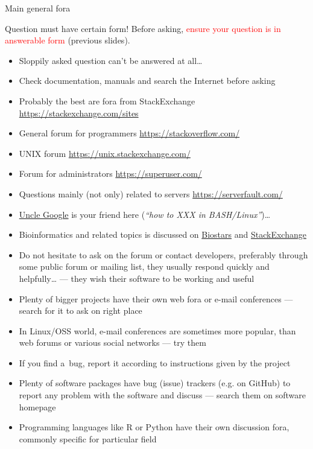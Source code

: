 \documentclass[compress, ucs, xelatex, 11pt, xcolor=svgnames, aspectratio=169,
	hyperref={
		bookmarks=true,
		unicode=true,
		colorlinks=true,
		pdftitle={Linux, command line and MetaCentrum},
		plainpages=false,
		pdfauthor={Vojtech Zeisek},
		pdfsubject={Course about use of Linux command line, writing shell scripts and using MetaCentrum of CESNET},
		pdfcreator={XeLaTeX},
		pdfkeywords={Linux, GNU, BASH, shell, command line, MetaCentrum},
		linkcolor=DarkRed, %
		anchorcolor=DarkBlue, %
		citecolor=Indigo, %
		filecolor=NavyBlue, %
		menucolor=DarkMagenta, %
		urlcolor=DarkBlue, %
		pdftex},
	url={hyphens, lowtilde} %
	]{beamer}
\renewcommand{\alert}[1]{\textcolor{red}{#1}}
\begin{document}
\begin{frame}[allowframebreaks]{Main general fora}
	\begin{block}{Question must have certain form!}
			Before asking, \alert{ensure your question is in answerable form} (previous slides).
		\begin{itemize}
			\item Sloppily asked question can't be answered at all\ldots
			\item Check documentation, manuals and search the Internet before asking
		\end{itemize}
	\end{block}
	\begin{itemize}
		\item Probably the best are fora from StackExchange \url{https://stackexchange.com/sites}
		\item General forum for programmers \url{https://stackoverflow.com/}
		\item UNIX forum \url{https://unix.stackexchange.com/}
		\item Forum for administrators \url{https://superuser.com/}
		\item Questions mainly (not only) related to servers \url{https://serverfault.com/}
		\item \href{https://www.startpage.com/}{Uncle Google} is your friend here (\textit{\enquote{how to XXX in BASH/Linux}})\ldots
		\item Bioinformatics and related topics is discussed on \href{https://www.biostars.org/}{Biostars} and \href{https://bioinformatics.stackexchange.com/}{StackExchange}
		\item Do not hesitate to ask on the forum or contact developers, preferably through some public forum or mailing list, they usually respond quickly and helpfully\ldots{ }--- they wish their software to be working and useful
		\item Plenty of bigger projects have their own web fora or e-mail conferences --- search for it to ask on right place
		\item In Linux/OSS world, e-mail conferences are sometimes more popular, than web forums or various social networks --- try them
		\item If you find a~bug, report it according to instructions given by the project
		\item Plenty of software packages have bug (issue) trackers (e.g. on GitHub) to report any problem with the software and discuss --- search them on software homepage
		\item Programming languages like R or Python have their own discussion fora, commonly specific for particular field
	\end{itemize}
\end{frame}
\end{document}
